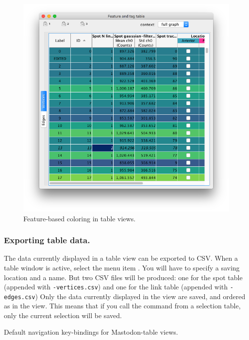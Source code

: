 \begin{figure}
    \centering
    \includegraphics[height=0.27\textheight]{figures/Mastodon_TableView9.png}
    
    \caption{Feature-based coloring in table views.  }
    \label{fig:TableViewFeatureColoring}
\end{figure}

\subsubsection{Exporting table data.}

The data currently displayed in a table view can be exported to CSV.
When a table window is active, select the menu item .
You will have to specify a saving location and a name.
But two CSV files will be produced: one for the spot table (appended with \texttt{-vertices.csv}) and one for the link table (appended with \texttt{-edges.csv})
Only the data currently displayed in the view are saved, and ordered as in the view. 
This means that if you call the  command from a selection table, only the current selection will be saved.


\begin{table}[!htbp]
    \centering
    
    \caption{Default navigation key-bindings for Mastodon-table views.}

    

    \label{tab:MastodonTableKeys}
    \vspace{-10pt}

\end{table}
